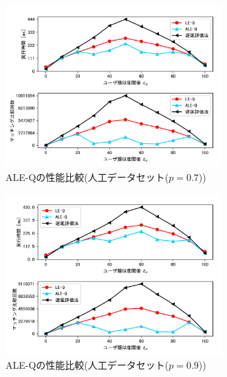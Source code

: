 \begin{figure}[H]
    \centering
    \includegraphics[width=8.3cm]{eimg/exp3_7.png}
    \caption{ALE-Qの性能比較(人工データセット($p=0.7$))}
    \label{fig:exp3_7}
\end{figure}
\begin{figure}[H]
    \centering
    \includegraphics[width=8.3cm]{eimg/exp3_9.png}
    \caption{ALE-Qの性能比較(人工データセット($p=0.9$))}
    \label{fig:exp3_9}
\end{figure}

